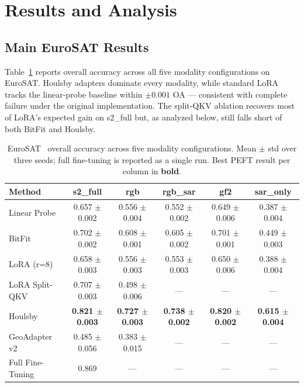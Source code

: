 \section{Results and Analysis}
\label{sec:results}

\subsection{Main EuroSAT Results}
Table~\ref{tab:eurosat-main} reports overall accuracy across all five modality configurations on EuroSAT. Houlsby adapters dominate every modality, while standard LoRA tracks the linear-probe baseline within $\pm 0.001$ OA --- consistent with complete failure under the original implementation. The split-QKV ablation recovers most of LoRA's expected gain on s2\_full but, as analyzed below, still falls short of both BitFit and Houlsby.

\begin{table}[t]
\centering
\small
\caption{EuroSAT~\cite{helber2019eurosat} overall accuracy across five modality configurations. Mean $\pm$ std over three seeds; full fine-tuning is reported as a single run. Best PEFT result per column in \textbf{bold}.}
\label{tab:eurosat-main}
\begin{tabular}{lccccc}
\toprule
Method & s2\_full & rgb & rgb\_sar & gf2 & sar\_only \\
\midrule
Linear Probe        & 0.657 $\pm$ 0.002 & 0.556 $\pm$ 0.004 & 0.552 $\pm$ 0.002 & 0.649 $\pm$ 0.006 & 0.387 $\pm$ 0.004 \\
BitFit              & 0.702 $\pm$ 0.002 & 0.608 $\pm$ 0.001 & 0.605 $\pm$ 0.002 & 0.701 $\pm$ 0.001 & 0.449 $\pm$ 0.003 \\
LoRA (r=8)          & 0.658 $\pm$ 0.003 & 0.556 $\pm$ 0.003 & 0.553 $\pm$ 0.003 & 0.650 $\pm$ 0.006 & 0.388 $\pm$ 0.004 \\
LoRA Split-QKV      & 0.707 $\pm$ 0.003 & 0.498 $\pm$ 0.006 & --- & --- & --- \\
Houlsby             & \textbf{0.821 $\pm$ 0.003} & \textbf{0.727 $\pm$ 0.003} & \textbf{0.738 $\pm$ 0.002} & \textbf{0.820 $\pm$ 0.002} & \textbf{0.615 $\pm$ 0.004} \\
GeoAdapter v2       & 0.485 $\pm$ 0.056 & 0.383 $\pm$ 0.015 & --- & --- & --- \\
\midrule
Full Fine-Tuning    & 0.869 & --- & --- & --- & --- \\
\bottomrule
\end{tabular}
\end{table}

